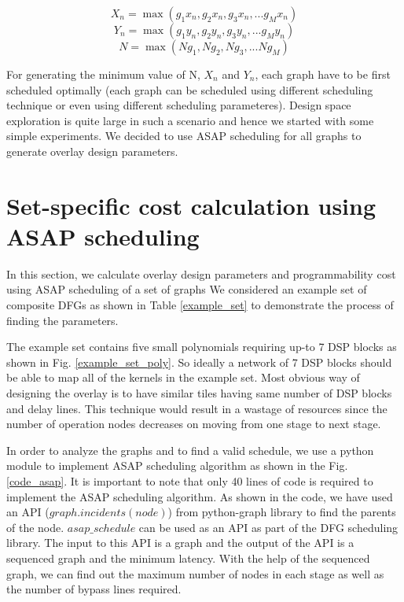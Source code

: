 \begin{equation}
X_{n} = \max (g_{1}x_{n}, g_{2}x_{n}, g_{3}x_{n}, ...g_{M}x_{n})
\end{equation}
\begin{equation}
Y_{n} = \max (g_{1}y_{n}, g_{2}y_{n}, g_{3}y_{n}, ...g_{M}y_{n})
\end{equation}
\begin{equation}
N = \max (Ng_{1}, Ng_{2}, Ng_{3}, ...Ng_{M})
\end{equation}

For generating the minimum value of N, $X_{n}$ and $Y_{n}$, each graph have to be first scheduled optimally (each graph can be scheduled using different scheduling technique or even using different scheduling parameteres). Design space exploration is quite large in such a scenario and hence we started with some simple experiments. 
We decided to use ASAP scheduling for all graphs to generate overlay design parameters.

\section{Set-specific cost calculation using ASAP scheduling}
In this section, we calculate overlay design parameters and programmability cost using ASAP scheduling of a set of graphs
We considered an example set of composite DFGs as shown in Table \ref{example_set} to demonstrate the process of finding the parameters.


The example set contains five small polynomials requiring up-to 7 DSP blocks as shown in Fig. \ref{example_set_poly}. 
So ideally a network of 7 DSP blocks should be able to map all of the kernels in the example set.
Most obvious way of designing the overlay is to have similar tiles having same number of DSP blocks and delay lines. This technique would result in a wastage of resources since the number of operation nodes decreases on moving from one stage to next stage. 



In order to analyze the graphs and to find a valid schedule, we use a python module to implement ASAP scheduling algorithm as shown in the Fig. \ref{code_asap}.
It is important to note that only 40 lines of code is required to implement the ASAP scheduling algorithm.
As shown in the code, we have used an API ($graph.incidents(node)$) from python-graph library to find the parents of the node. 
$asap\_schedule$ can be used as an API as part of the DFG scheduling library.
The input to this API is a graph and the output of the API is a sequenced graph and the minimum latency.
With the help of the sequenced graph, we can find out the maximum number of nodes in each stage as well as the number of bypass lines required.

